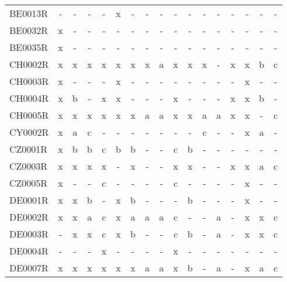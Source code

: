 \begin{table}
{{\begin{tabular}{l|cccccccccccccccc}
        BE0013R &  - &   - &    - &      - &   x &    - &    - &    - &      - &    - &    - &   - &      - &    - &    - &     - \\
        BE0032R &  x &   - &    - &      - &   - &    - &    - &    - &      - &    - &    - &   - &      - &    - &    - &     - \\
        BE0035R &  x &   - &    - &      - &   - &    - &    - &    - &      - &    - &    - &   - &      - &    - &    - &     - \\
        CH0002R &  x &   x &    x &      x &   x &    x &    x &    a &      x &    x &    x &   - &      x &    x &    b &     c \\
        CH0003R &  x &   - &    - &      - &   x &    - &    - &    - &      - &    - &    - &   - &      - &    x &    - &     - \\
        CH0004R &  x &   b &    - &      x &   x &    - &    - &    - &      x &    - &    - &   - &      x &    x &    b &     - \\
        CH0005R &  x &   x &    x &      x &   x &    x &    a &    a &      x &    x &    a &   a &      x &    x &    - &     c \\
        CY0002R &  x &   a &    c &      - &   - &    - &    - &    - &      - &    - &    c &   - &      - &    x &    a &     - \\
        CZ0001R &  x &   b &    b &      c &   b &    b &    - &    - &      c &    b &    - &   - &      - &    - &    - &     - \\
        CZ0003R &  x &   x &    x &      x &   - &    x &    - &    - &      x &    x &    - &   - &      x &    x &    a &     c \\
        CZ0005R &  x &   - &    - &      c &   - &    - &    - &    - &      c &    - &    - &   - &      - &    x &    - &     - \\
        DE0001R &  x &   x &    b &      - &   x &    b &    - &    - &      - &    b &    - &   - &      - &    x &    - &     - \\
        DE0002R &  x &   x &    a &      c &   x &    a &    a &    a &      c &    - &    - &   a &      - &    x &    x &     c \\
        DE0003R &  - &   x &    x &      c &   x &    b &    - &    - &      c &    b &    - &   a &      - &    x &    x &     c \\
        DE0004R &  - &   - &    - &      x &   - &    - &    - &    - &      x &    - &    - &   - &      - &    - &    - &     - \\
        DE0007R &  x &   x &    x &      x &   x &    x &    a &    a &      x &    b &    - &   a &      - &    x &    a &     c \\

\end{tabular}}}
\end{table}
